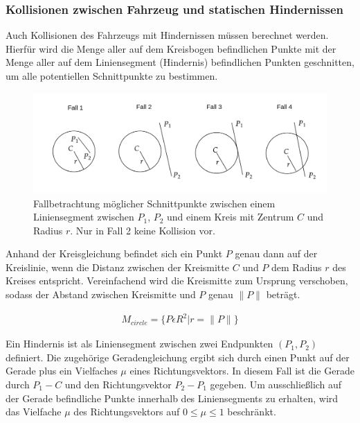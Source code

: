\subsubsection{Kollisionen zwischen Fahrzeug und statischen Hindernissen}
Auch Kollisionen des Fahrzeugs mit Hindernissen müssen berechnet werden. Hierfür wird
die Menge aller auf dem Kreisbogen befindlichen Punkte mit der Menge aller auf
dem Liniensegment (Hindernis) befindlichen Punkten geschnitten, um alle potentiellen
Schnittpunkte zu bestimmen.\\

\begin{figure}[h]
  \centering
  \includegraphics[width = 1.0\textwidth]{imgs/line_circle_intersections}
  \caption{Fallbetrachtung möglicher Schnittpunkte zwischen einem Liniensegment
  zwischen $P_1$, $P_2$ und einem Kreis mit Zentrum $C$ und Radius $r$.
  Nur in Fall 2 keine Kollision vor.}
  \label{fig:linseg_circle_intersect}
\end{figure}

Anhand der Kreisgleichung befindet sich ein Punkt $P$ genau dann auf der Kreislinie,
wenn die Distanz zwischen der Kreismitte $C$ und $P$ dem Radius $r$ des Kreises
entspricht. Vereinfachend wird die Kreismitte zum Ursprung verschoben, sodass
der Abstand zwischen Kreismitte und $P$ genau $\lVert P \rVert$ beträgt.

\begin{equation}
\begin{aligned}
M_{circle} = \{ P \epsilon R^2 | r = \lVert P \rVert \}
\end{aligned}
\end{equation}

Ein Hindernis ist als Liniensegment zwischen zwei Endpunkten $(P_1, P_2)$ definiert.
Die zugehörige Geradengleichung ergibt sich durch einen Punkt auf der Gerade plus
ein Vielfaches $\mu$ eines Richtungsvektors. In diesem Fall ist die Gerade durch
$P_1 - C$ und den Richtungsvektor $P_2 - P_1$ gegeben. Um ausschließlich auf
der Gerade befindliche Punkte innerhalb des Liniensegments zu erhalten, wird das
Vielfache $\mu$ des Richtungsvektors auf $0 \le \mu \le 1$ beschränkt.

